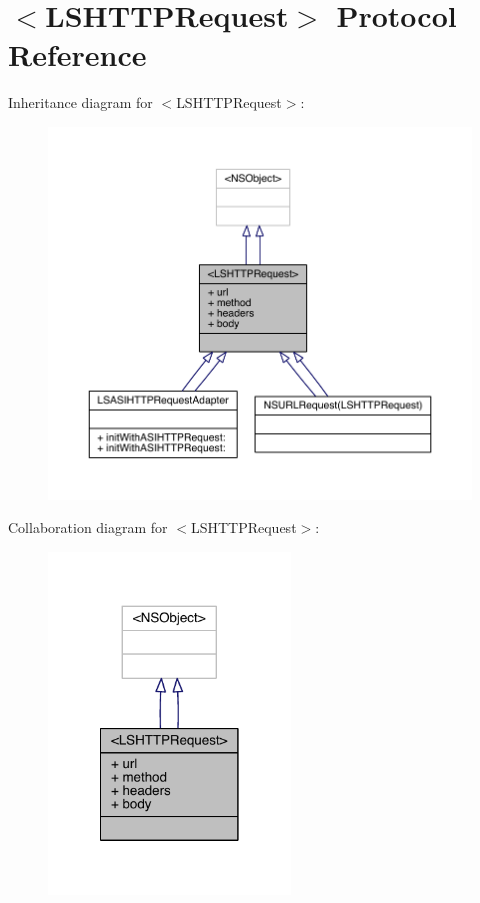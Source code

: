 \hypertarget{protocol_l_s_h_t_t_p_request-p}{\section{$<$L\-S\-H\-T\-T\-P\-Request$>$ Protocol Reference}
\label{protocol_l_s_h_t_t_p_request-p}
}


Inheritance diagram for $<$L\-S\-H\-T\-T\-P\-Request$>$\-:\nopagebreak
\begin{figure}[H]
\begin{center}
\leavevmode
\includegraphics[width=350pt]{protocol_l_s_h_t_t_p_request-p__inherit__graph}
\end{center}
\end{figure}


Collaboration diagram for $<$L\-S\-H\-T\-T\-P\-Request$>$\-:\nopagebreak
\begin{figure}[H]
\begin{center}
\leavevmode
\includegraphics[width=182pt]{protocol_l_s_h_t_t_p_request-p__coll__graph}
\end{center}
\end{figure}
